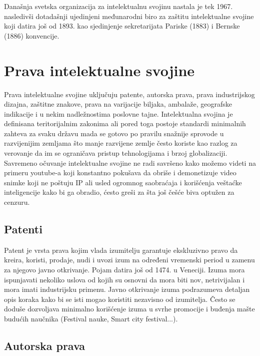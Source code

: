 \documentclass[a4paper]{article}
\begin{document}
Današnja svetska organizacija za intelektualnu svojinu nastala je tek 1967. nasledivši dotadašnji ujedinjeni međunarodni biro za zaštitu intelektualne svojine koji datira još od 1893. kao sjedinjenje sekretarijata Pariske (1883) i Bernske (1886) konvencije.

\section{Prava intelektualne svojine}	
\label{sec:prava_int_svoj}

Prava intelektualne svojine uključuju patente, autorska prava, prava industrijskog dizajna, zaštitne znakove, prava na varijacije biljaka, ambalaže, geografske indikacije i u nekim nadležnostima poslovne tajne. Intelektualna svojina je definisana
teritorijalnim zakonima ali pored toga postoje standardi minimalnih zahteva za
svaku državu mada se gotovo po pravilu snažnije sprovode u razvijenijim
zemljama što manje razvijene zemlje često koriste kao razlog za verovanje da im
se ograničava pristup tehnologijama i brzoj globalizaciji. Savremeno očuvanje
intelektualne svojine ne radi savršeno kako možemo videti na primeru youtube-a
koji konstantno pokušava da obriše i demonetizuje video snimke koji ne poštuju
IP ali usled ogromnog saobraćaja i korišćenja veštaćke inteligencije kako bi ga obradio, ćesto greši za šta još češće biva optužen za cenzuru.

\subsection{Patenti}
\label{subsec:patenti}

Patent je vrsta prava kojim vlada izumitelju garantuje ekskluzivno pravo da kreira, koristi, prodaje, nudi i uvozi izum na određeni vremenski period u zamenu za njegovo javno otkrivanje. Pojam datira još od 1474. u Veneciji. Izuma mora ispunjavati nekoliko uslova od kojih su osnovni da mora biti nov, netrivijalan i mora imati industrijsku primenu. Javno otkrivanje izuma podrazumeva detaljan opis koraka kako bi se isti mogao koristiti nezavisno od izumitelja. Često se doduše dozvoljava minimalno korišćenje izuma u svrhe promocije i buđenja mašte budućih naučnika (Festival nauke, Smart city festival...).

\subsection{Autorska prava}
\label{subsec:autorska}
\end{document}
